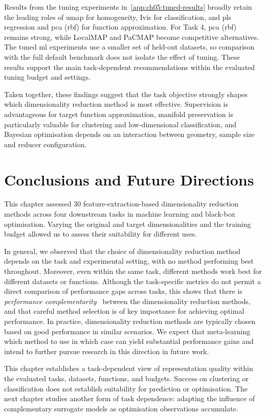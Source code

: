 Results from the tuning experiments in~\cref{app:ch05:tuned-results} broadly retain the leading roles of \gls{umap} for homogeneity, Ivis for classification, and \gls{pls} regression and \gls{pca} (\gls{rbf}) for function approximation. For Task 4, \gls{pca} (\gls{rbf}) remains strong, while LocalMAP and PaCMAP become competitive alternatives. The tuned \gls{ml} experiments use a smaller set of held-out datasets, so comparison with the full default benchmark does not isolate the effect of tuning. These results support the main task-dependent recommendations within the evaluated tuning budget and settings.

Taken together, these findings suggest that the task objective strongly shapes which dimensionality reduction method is most effective. Supervision is advantageous for target function approximation, manifold preservation is particularly valuable for clustering and low-dimensional classification, and Bayesian optimisation depends on an interaction between geometry, sample size and reducer configuration.

\section{Conclusions and Future Directions}
\label{sec:ch05:concl}

This chapter assessed 30 feature-extraction-based dimensionality reduction methods across four downstream tasks in machine learning and black-box optimisation. Varying the original and target dimensionalities and the training budget allowed us to assess their suitability for different uses.

In general,
we observed that the choice of dimensionality reduction method depends on the task and experimental setting, with no method performing best throughout.
Moreover, even within the same task, different methods work best for different datasets or functions.
Although the task-specific metrics do not permit a direct comparison of performance gaps across tasks,
this shows that there is \textit{performance complementarity}~\cite{Rice76,FreEtAl16} between the dimensionality reduction methods, and that careful method selection is of key importance for achieving optimal performance.
In practice, dimensionality reduction methods are typically chosen based on good performance in similar scenarios.
We expect that meta-learning which method to use in which case can yield substantial performance gains and intend to further pursue research in this direction in future work.

This chapter establishes a task-dependent view of representation quality within the evaluated tasks, datasets, functions, and budgets. Success on clustering or classification does not establish suitability for prediction or optimisation. The next chapter studies another form of task dependence: adapting the influence of complementary surrogate models as optimisation observations accumulate.
